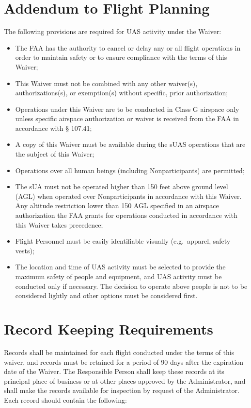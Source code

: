 \documentclass[
]{book}
\providecommand{\tightlist}{%
  \setlength{\itemsep}{0pt}\setlength{\parskip}{0pt}}
\begin{document}
\hypertarget{s39v-fp}{%
\section{Addendum to Flight Planning}\label{s39v-fp}}

The following provisions are required for UAS activity under the Waiver:

\begin{itemize}
\tightlist
\item
  The FAA has the authority to cancel or delay any or all flight operations in order to maintain safety or to ensure compliance with the terms of this Waiver;
\item
  This Waiver must not be combined with any other waiver(s), authorizations(s), or exemption(s) without specific, prior authorization;
\item
  Operations under this Waiver are to be conducted in Class G airspace only unless specific airspace authorization or waiver is received from the FAA in accordance with § 107.41;
\item
  A copy of this Waiver must be available during the sUAS operations that are the subject of this Waiver;
\item
  Operations over all human beings (including Nonparticipants) are permitted;
\item
  The sUA must not be operated higher than 150 feet above ground level (AGL) when operated over Nonparticipants in accordance with this Waiver. Any altitude restriction lower than 150 AGL specified in an airspace authorization the FAA grants for operations conducted in accordance with this Waiver takes precedence;
\item
  Flight Personnel must be easily identifiable visually (e.g.~apparel, safety vests);
\item
  The location and time of UAS activity must be selected to provide the maximum safety of people and equipment, and UAS activity must be conducted only if necessary. The decision to operate above people is not to be considered lightly and other options must be considered first.
\end{itemize}

\hypertarget{s39v-rk}{%
\section{Record Keeping Requirements}\label{s39v-rk}}

Records shall be maintained for each flight conducted under the terms of this waiver, and records must be retained for a period of 90 days after the expiration date of the Waiver. The Responsible Person shall keep these records at its principal place of business or at other places approved by the Administrator, and shall make the records available for inspection by request of the Administrator. Each record should contain the following:
\end{document}
